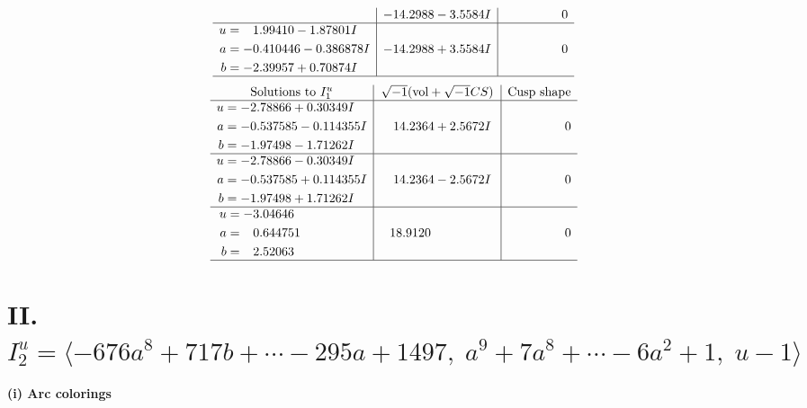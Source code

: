 \documentclass[1p]{elsarticle_modified}
\theoremstyle{definition}
\newcommand{\I}{\sqrt{-1}}
\begin{document}
$$\begin{array}{c|c|c}
 & -14.2988 - 3.5584 I & \phantom{-0.000000 } 0 \\ \hline\begin{aligned}
u &= \phantom{-}1.99410 - 1.87801 I \\
a &= -0.410446 - 0.386878 I \\
b &= -2.39957 + 0.70874 I\end{aligned}
 & -14.2988 + 3.5584 I & \phantom{-0.000000 } 0\\
 \hline 
 \end{array}$$\newpage$$\begin{array}{c|c|c}  
\text{Solutions to }I^u_{1}& \I (\text{vol} + \sqrt{-1}CS) & \text{Cusp shape}\\
 \hline 
\begin{aligned}
u &= -2.78866 + 0.30349 I \\
a &= -0.537585 - 0.114355 I \\
b &= -1.97498 - 1.71262 I\end{aligned}
 & \phantom{-}14.2364 + 2.5672 I & \phantom{-0.000000 } 0 \\ \hline\begin{aligned}
u &= -2.78866 - 0.30349 I \\
a &= -0.537585 + 0.114355 I \\
b &= -1.97498 + 1.71262 I\end{aligned}
 & \phantom{-}14.2364 - 2.5672 I & \phantom{-0.000000 } 0 \\ \hline\begin{aligned}
u &= -3.04646\phantom{ +0.000000I} \\
a &= \phantom{-}0.644751\phantom{ +0.000000I} \\
b &= \phantom{-}2.52063\phantom{ +0.000000I}\end{aligned}
 & \phantom{-}18.9120\phantom{ +0.000000I} & \phantom{-0.000000 } 0\\
 \hline 
 \end{array}$$\newpage\newpage\renewcommand{\arraystretch}{1}
\centering \section*{II. $I^u_{2}= \langle -676 a^8+717 b+\cdots-295 a+1497,\;a^9+7 a^8+\cdots-6 a^2+1,\;u-1 \rangle$}
\flushleft \textbf{(i) Arc colorings}\\
\end{document}
